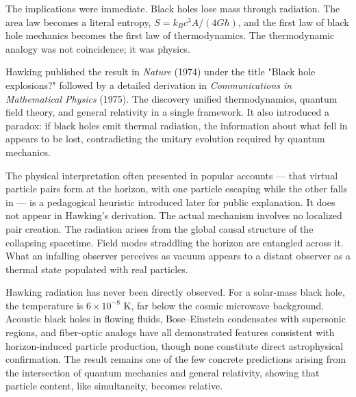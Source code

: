 \begin{commentary}
The implications were immediate. Black holes lose mass through radiation. The area law becomes a literal entropy, $S = k_B c^3 A/(4G\hbar)$, and the first law of black hole mechanics becomes the first law of thermodynamics. The thermodynamic analogy was not coincidence; it was physics.

Hawking published the result in \textit{Nature} (1974) under the title "Black hole explosions?" followed by a detailed derivation in \textit{Communications in Mathematical Physics} (1975). The discovery unified thermodynamics, quantum field theory, and general relativity in a single framework. It also introduced a paradox: if black holes emit thermal radiation, the information about what fell in appears to be lost, contradicting the unitary evolution required by quantum mechanics.

The physical interpretation often presented in popular accounts — that virtual particle pairs form at the horizon, with one particle escaping while the other falls in — is a pedagogical heuristic introduced later for public explanation. It does not appear in Hawking's derivation. The actual mechanism involves no localized pair creation. The radiation arises from the global causal structure of the collapsing spacetime. Field modes straddling the horizon are entangled across it. What an infalling observer perceives as vacuum appears to a distant observer as a thermal state populated with real particles.

Hawking radiation has never been directly observed. For a solar-mass black hole, the temperature is $6 \times 10^{-8}$ K, far below the cosmic microwave background. Acoustic black holes in flowing fluids, Bose–Einstein condensates with supersonic regions, and fiber-optic analogs have all demonstrated features consistent with horizon-induced particle production, though none constitute direct astrophysical confirmation. The result remains one of the few concrete predictions arising from the intersection of quantum mechanics and general relativity, showing that particle content, like simultaneity, becomes relative.
\end{commentary}

